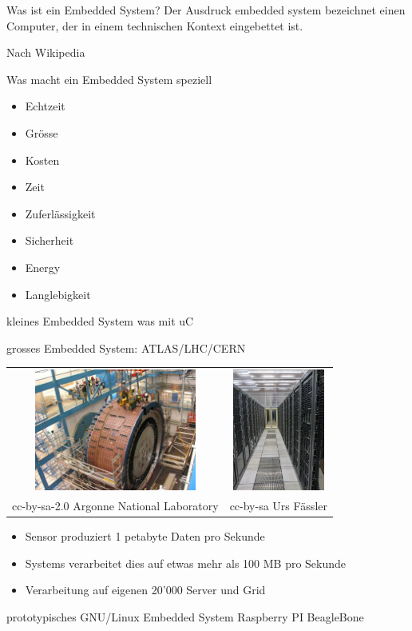 \begin{frame}{Was ist ein Embedded System?}
	Der Ausdruck embedded system bezeichnet einen Computer, der in einem technischen Kontext eingebettet ist. \cite{wikiEmbedded}
	\begin{flushright}
		Nach Wikipedia
	\end{flushright}
	
	Was macht ein Embedded System speziell \cite{embeddedSpecials}
	\begin{itemize}
		\item Echtzeit
		\item Grösse
		\item Kosten
		\item Zeit
		\item Zuferlässigkeit
		\item Sicherheit
		\item Energy
		\item Langlebigkeit
	\end{itemize}
\end{frame}

\begin{frame}{kleines Embedded System}
	was mit uC
\end{frame}

\begin{frame}{grosses Embedded System: ATLAS/LHC/CERN}
	\begin{center}
		\begin{tabular}{cc}
			\includegraphics[height=4cm]{res/ATLAS_Tile_Calorimeter} &  \includegraphics[height=4cm]{res/CERN_server.jpg} \\ 
			cc-by-sa-2.0 Argonne National Laboratory & cc-by-sa Urs Fässler \\
		\end{tabular} 
	\end{center}
	\begin{itemize}
		\item Sensor produziert 1 petabyte Daten pro Sekunde
		\item Systems verarbeitet dies auf etwas mehr als 100 MB pro Sekunde \cite{wikiAtlas}
		\item Verarbeitung auf eigenen 20'000 Server und Grid \cite{wikiCernServer}
	\end{itemize}
\end{frame}

\begin{frame}{prototypisches GNU/Linux Embedded System}
	Raspberry PI
	BeagleBone
\end{frame}
	
